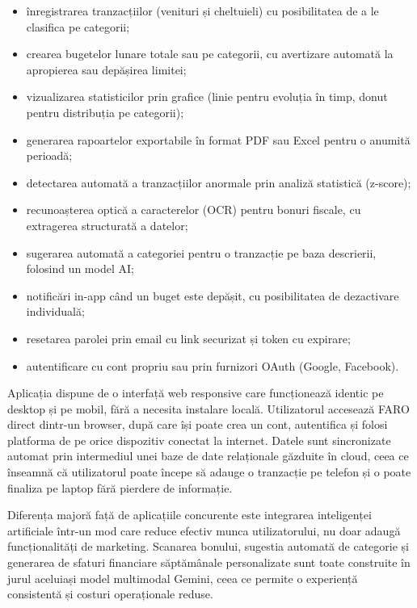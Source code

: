 \documentclass[12pt,a4paper,oneside]{report}
\begin{document}
\begin{itemize}[leftmargin=2cm,itemsep=2pt]
  \item înregistrarea tranzacțiilor (venituri și cheltuieli) cu posibilitatea de a le clasifica pe categorii;
  \item crearea bugetelor lunare totale sau pe categorii, cu avertizare automată la apropierea sau depășirea limitei;
  \item vizualizarea statisticilor prin grafice (linie pentru evoluția în timp, donut pentru distribuția pe categorii);
  \item generarea rapoartelor exportabile în format PDF sau Excel pentru o anumită perioadă;
  \item detectarea automată a tranzacțiilor anormale prin analiză statistică (z-score);
  \item recunoașterea optică a caracterelor (OCR) pentru bonuri fiscale, cu extragerea structurată a datelor;
  \item sugerarea automată a categoriei pentru o tranzacție pe baza descrierii, folosind un model AI;
  \item notificări in-app când un buget este depășit, cu posibilitatea de dezactivare individuală;
  \item resetarea parolei prin email cu link securizat și token cu expirare;
  \item autentificare cu cont propriu sau prin furnizori OAuth (Google, Facebook).
\end{itemize}

Aplicația dispune de o interfață web responsive care funcționează identic pe desktop și pe mobil, fără a necesita instalare locală. Utilizatorul accesează FARO direct dintr-un browser, după care își poate crea un cont, autentifica și folosi platforma de pe orice dispozitiv conectat la internet. Datele sunt sincronizate automat prin intermediul unei baze de date relaționale găzduite în cloud, ceea ce înseamnă că utilizatorul poate începe să adauge o tranzacție pe telefon și o poate finaliza pe laptop fără pierdere de informație.

Diferența majoră față de aplicațiile concurente este integrarea inteligenței artificiale într-un mod care reduce efectiv munca utilizatorului, nu doar adaugă funcționalități de marketing. Scanarea bonului, sugestia automată de categorie și generarea de sfaturi financiare săptămânale personalizate sunt toate construite în jurul aceluiași model multimodal Gemini, ceea ce permite o experiență consistentă și costuri operaționale reduse.
\end{document}

